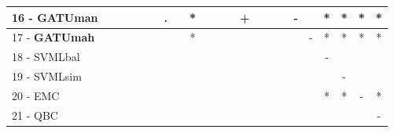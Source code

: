 \begin{table}[h]
\begin{center}
\begin{tabular}{lcc|cc|cc|cc|cc|cc|cc|cc|cc|cc|c}
16 - \textbf{GATUman}	&   &   &   &   &   & . &   & * &   &   &   & + &   &   &   & - &   & * & * & * & * \\ \hline
17 - \textbf{GATUmah}	&   &   &   &   &   &   &   & * &   &   &   &   &   &   &   &   & - & * & * & * & * \\
18 - SVMLbal	&   &   &   &   &   &   &   &   &   &   &   &   &   &   &   &   &   & - &   &   &   \\ \hline
19 - SVMLsim	&   &   &   &   &   &   &   &   &   &   &   &   &   &   &   &   &   &   & - &   &   \\
20 - EMC  	&   &   &   &   &   &   &   &   &   &   &   &   &   &   &   &   &   & * & * & - & * \\ \hline
21 - QBC  	&   &   &   &   &   &   &   &   &   &   &   &   &   &   &   &   &   &   &   &   & - \\\end{tabular}
\label{stratsALCKappaFriedELMRedux}
\end{center}
\end{table}